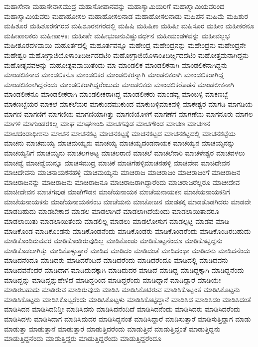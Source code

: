{ಮಹಾಸೇನಾ
ಮಹಾಸೇನಾಸಮುದ್ರ
ಮಹಾಸೋಪಾನವನ್ನು
ಮಹಾಸ್ವಾಮಿಯರಿಗೆ
ಮಹಾಸ್ವಾಮಿಯವರಿಂದ
ಮಹಾಸ್ವಾಮಿಯವರು
ಮಹಾಹೋಸಲ
ಮಹಾಹೋಸಲನಾಡ
ಮಹಾಹೋಸಲನಾಡು
ಮಹಿಪನ
ಮಹಿಮೆ
ಮಹಿಶುರ
ಮಹಿಶೂರ
ಮಹಿಶೂರನಗರದ
ಮಹಿಶೂರನಗರದಲ್ಲಿ
ಮಹಿಷಿ
ಮಹಿಷಿಕಾ
ಮಹಿಷೀ
ಮಹಿಸೂರ
ಮಹೀಂ
ಮಹೀಕರನೂ
ಮಹೀಪಾಲಕರು
ಮಹೀಪಾಳಕಃ
ಮಹೀಪೇ
ಮಹೀಭುಜನುವಿಷ್ಣುವರ್ಧನ
ಮಹೀಮಂಡಳವನ್ನು
ಮಹೀವಲ್ಲಭ
ಮಹೀಶೂರದಳವಾಯಿ
ಮಹೂರ್ತದಲ್ಲಿ
ಮಹೂರ್ತವನ್ನೂ
ಮಹೇಂದ್ರ
ಮಹೇಂದ್ರನನ್ನು
ಮಹೇಂದ್ರನು
ಮಹೇಂದ್ರನೇ
ಮಹೇಶ್ವರಿ
ಮಹೋಗ್ರಾಜಿಯೊಳಾಂತಿದಿರ್ಚಿದದಟಿಂ
ಮಹೋಗ್ರಾಜಿಯೊಳಾಂತಿದಿರ್ಚ್ಚಿದದಟಿಂ
ಮಹೋತ್ತಮನಾಗಿದ್ದನು
ಮಹೋತ್ಸವವಅನ್ನು
ಮಹೋತ್ಸವವಾಯಿತೆಂದು
ಮಾ
ಮಾಂಡಲಿಕ
ಮಾಂಡಲಿಕನಾಗಿ
ಮಾಂಡಲಿಕನಾಗಿದ್ದನು
ಮಾಂಡಲಿಕನಾದ
ಮಾಂಡಲಿಕನೂ
ಮಾಂಡಲಿಕರ
ಮಾಂಡಲಿಕರನ್ನಾಗಿ
ಮಾಂಡಲಿಕರಾಗಿ
ಮಾಂಡಲಿಕರಾಗಿದ್ದ
ಮಾಂಡಲಿಕರಾಗಿದ್ದರೆಂದು
ಮಾಂಡಲಿಕರಾಗಿದ್ದರೆಂಬುದು
ಮಾಂಡಲಿಕರು
ಮಾಂಡಲಿಕರೊಡನೆ
ಮಾಂಡಲೀಕನಾಗಿ
ಮಾಂಡಲೀಕನೂ
ಮಾಂಡಲೀಕರಾಗಿ
ಮಾಂಡಲೀಕರಾಗಿದ್ದ
ಮಾಂಡಲೀಕರು
ಮಾಂಡವ್ಯ
ಮಾಂಬಳ್ಳಿ
ಮಾಕಣಬ್ಬೆ
ಮಾಕಣಬ್ಬೆಯರ
ಮಾಕಲೆ
ಮಾಕಲೆಯರ
ಮಾಕುಂದಮುಕುಂದ
ಮಾಕುಬಳ್ಳಿಮಾಕವಳ್ಳಿ
ಮಾಕೇಶ್ವರ
ಮಾಗಡಿ
ಮಾಗಡಿಯ
ಮಾಗಣಿ
ಮಾಗಣಿಗೆ
ಮಾಗಣಿಯ
ಮಾಗಣಿಯಾಗಿತ್ತು
ಮಾಗಣಿಯೊಳಗೆ
ಮಾಗಣೆಗೆ
ಮಾಗಣೆಯ
ಮಾಗನೂರು
ಮಾಗಲ
ಮಾಗಳಿ
ಮಾಗುಂಡರಕಿಲ್ಲ
ಮಾಘ
ಮಾಘಣಂದಿ
ಮಾಚಗವುಡ
ಮಾಚಗೌಂಡ
ಮಾಚಣ
ಮಾಚಣನ
ಮಾಚದಂಡಾಧೀಶನು
ಮಾಚನ
ಮಾಚನಕಟ್ಟ
ಮಾಚನಕಟ್ಟಕ್ಕೆ
ಮಾಚನಕಟ್ಟದ
ಮಾಚನಕಟ್ಟದಲ್ಲಿ
ಮಾಚನಕಟ್ಟೆಯ
ಮಾಚನು
ಮಾಚಮಯ್ಯ
ಮಾಚಮಯ್ಯನು
ಮಾಚಯ್ಯ
ಮಾಚಯ್ಯದಂಡನಾಯಕ
ಮಾಚಯ್ಯನ
ಮಾಚಯ್ಯನನ್ನು
ಮಾಚಯ್ಯನಿಗೆ
ಮಾಚಯ್ಯನು
ಮಾಚಲಗಅಟ್ಟ
ಮಾಚಲರಾಣಿ
ಮಾಚಲೆ
ಮಾಚಲೆನಾರಿ
ಮಾಚಳೇಶ್ವರ
ಮಾಚವಳಲು
ಮಾಚವ್ವೆ
ಮಾಚವ್ವೆಯನ್ನೂ
ಮಾಚಸಮುದ್ರ
ಮಾಚಿಕೆ
ಮಾಚಿಗೆಹಳ್ಳಿಮಾಚನಹಳ್ಳಿ
ಮಾಚಿದೇವ
ಮಾಚಿದೇವನ
ಮಾಚಿದೇವನು
ಮಾಚಿನಾಯಕನಹಳ್ಳಿ
ಮಾಚಿಮಯ್ಯನು
ಮಾಚಿರಾಜ
ಮಾಚಿರಾಜಂ
ಮಾಚಿರಾಜಂಗೆ
ಮಾಚಿರಾಜನ
ಮಾಚಿರಾಜನನ್ನು
ಮಾಚಿರಾಜನು
ಮಾಚಿರಾಜನೂ
ಮಾಚಿರಾಜರಾಗಿದ್ದಾರೆಂದು
ಮಾಚಿರಾಜರೆಲ್ಲರೂ
ಮಾಚೀದೇವ
ಮಾಚೀದೇವನ
ಮಾಚೆಗವುಡ
ಮಾಚೆಗೌಡನ
ಮಾಚೆಯನಾಯಕ
ಮಾಚೆಯನಾಯಕನ
ಮಾಚೆಯನಾಯಕನಿಗೆ
ಮಾಚೆಯನಾಯಕನು
ಮಾಚೆಯನಾಯಕನೆಂಬ
ಮಾಚೆಯನು
ಮಾಚೋಜನ
ಮಾಡತಕ್ಕ
ಮಾಡತೊಡಗಿದರು
ಮಾಡದೇ
ಮಾಡಬಹುದು
ಮಾಡಬೇಕಾದ
ಮಾಡಲ
ಮಾಡಲಾಗಿದೆ
ಮಾಡಲಾಗಿದೆಯೆಂದು
ಮಾಡಲಾಯಿತಾದರೂ
ಮಾಡಲಾಯಿತು
ಮಾಡಲಾಯಿತೆಂದು
ಮಾಡಲಿಲ್ಲ
ಮಾಡಲು
ಮಾಡಲೋಸುಗ
ಮಾಡಲ್ಪಟ್ಟ
ಮಾಡವ
ಮಾಡಿ
ಮಾಡಿಕೊಂಡ
ಮಾಡಿಕೊಂಡನು
ಮಾಡಿಕೊಂಡನೆಂದು
ಮಾಡಿಕೊಂಡರು
ಮಾಡಿಕೊಂಡರೆಂದು
ಮಾಡಿಕೊಂಡಿರಬಹುದು
ಮಾಡಿಕೊಂಡಿರುವವರ
ಮಾಡಿಕೊಂಡಿರುವುದಿಲ್ಲ
ಮಾಡಿಕೊಂಡು
ಮಾಡಿಕೊಟ್ಟನೆಂದೂ
ಮಾಡಿಕೊಟ್ಟಿದ್ದನು
ಮಾಡಿಕೊಡಲಾಗಿತ್ತು
ಮಾಡಿಕೊಳ್ಳುತ್ತಾರೆ
ಮಾಡಿದ
ಮಾಡಿದಂ
ಮಾಡಿದಂತೆ
ಮಾಡಿದಂಥಾ
ಮಾಡಿದನು
ಮಾಡಿದನೆಂದು
ಮಾಡಿದನೆಂದೂ
ಮಾಡಿದರು
ಮಾಡಿದರೆಂದಿದೆ
ಮಾಡಿದರೆಂದು
ಮಾಡಿದರೆಂದೂ
ಮಾಡಿದಲ್ಲಿ
ಮಾಡಿದವನು
ಮಾಡಿದವನೆಂದರೆ
ಮಾಡಿದಾಗ
ಮಾಡಿದುದಕ್ಕಾಗಿ
ಮಾಡಿದುದರ
ಮಾಡಿದೆ
ಮಾಡಿದ್ದ
ಮಾಡಿದ್ದಕ್ಕಾಗಿ
ಮಾಡಿದ್ದನೆಂದು
ಮಾಡಿದ್ದನ್ನು
ಮಾಡಿದ್ದನ್ನುಹೇಳಿದೆ
ಮಾಡಿದ್ದರಿಂದ
ಮಾಡಿದ್ದರೆಂದು
ಮಾಡಿದ್ದಾನೆ
ಮಾಡಿದ್ದಾರೆ
ಮಾಡಿಯೇ
ಮಾಡಿರಬಹುದು
ಮಾಡಿರುವ
ಮಾಡಿರುವುದು
ಮಾಡಿಸಿ
ಮಾಡಿಸಿಕೊಟಿರುವ
ಮಾಡಿಸಿಕೊಟ್ಟಂತೆ
ಮಾಡಿಸಿಕೊಟ್ಟನು
ಮಾಡಿಸಿಕೊಟ್ಟರು
ಮಾಡಿಸಿಕೊಟ್ಟರೆಂದು
ಮಾಡಿಸಿಕೊಟ್ಟಳು
ಮಾಡಿಸಿಕೊಟ್ಟಿದ್ದಾನೆ
ಮಾಡಿಸಿದ
ಮಾಡಿಸಿದಂ
ಮಾಡಿಸಿದಂತೆ
ಮಾಡಿಸಿದನ
ಮಾಡಿಸಿದನಿನ್ತೀ
ಮಾಡಿಸಿದನು
ಮಾಡಿಸಿದನೆಂದಿದೆ
ಮಾಡಿಸಿದನೆಂದು
ಮಾಡಿಸಿದರು
ಮಾಡಿಸಿದರೆಂದು
ಮಾಡಿಸಿದಳು
ಮಾಡಿಸಿದಾಗ
ಮಾಡಿಸಿದುದರ
ಮಾಡಿಸಿದ್ದನಂತೆ
ಮಾಡಿಸಿದ್ದಾರೆ
ಮಾಡಿಸುತ್ತಾರೆ
ಮಾಡಿಸುತ್ತಿದ್ದಾಗ
ಮಾಡು
ಮಾಡುತ್ತಾ
ಮಾಡುತ್ತಾನೆ
ಮಾಡುತ್ತಾರೆ
ಮಾಡುತ್ತಿದರೆಂದು
ಮಾಡುತ್ತಿದೆ
ಮಾಡುತ್ತಿದ್ದಂತೆ
ಮಾಡುತ್ತಿದ್ದನು
ಮಾಡುತ್ತಿದ್ದನೆಂದು
ಮಾಡುತ್ತಿದ್ದರು
ಮಾಡುತ್ತಿದ್ದರೆಂದು
ಮಾಡುತ್ತಿದ್ದರೆಂದೂ
}
